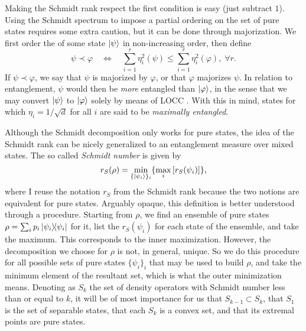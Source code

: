 		Making the Schmidt rank respect the first condition is easy (just subtract $1$). Using the Schmidt spectrum to impose a partial ordering on the set of pure states requires some extra caution, but it can be done through majorization. We first order the  of some state $\ket{\psi}$ in non-increasing order, then define
		$$
			\psi \prec \varphi \quad\Longleftrightarrow\quad \sum_{i=1}^{r} \eta_i^2(\psi) \leq \sum_{i=1}^{r} \eta_i^2(\varphi), \;\forall r .
		$$
		If $\psi \prec \varphi$, we say that $\psi$ is majorized by $\varphi$, or that $\varphi$ majorizes $\psi$. In relation to entanglement, $\psi$ would then be \emph{more} entangled than $\ket{\varphi}$, in the sense that we may convert $\ket{\psi}$ to $\ket{\varphi}$ solely by means of LOCC \cite{nielsen_1999_majorization,terra_tese}. With this in mind, states for which $\eta_i = 1/\sqrt{d}$ for all $i$ are said to be \emph{maximally entangled}.
	
		Although the Schmidt decomposition only works for pure states, the idea of the Schmidt rank can be nicely generalized to an entanglement measure over mixed states. The so called \emph{Schmidt number} \cite{terhal_2000_schmidtnumber} is given by 
		\begin{equation}
			r_S(\rho) = \min_{\{ \ket{\psi_i} \}_i} \{ \max_i \left[ r_S(\psi_i ) \right] \} ,
			\label{eq:schmidt-number}
		\end{equation}
		where I reuse the notation $r_S$ from the Schmidt rank because the two notions are equivalent for pure states. Arguably opaque, this definition is better understood through a procedure. Starting from $\rho$, we find an ensemble of pure states $\rho = \sum_i p_i \ketbra{\psi_i}{\psi_i}$ for it, list the $r_S(\psi_i)$ for each state of the ensemble, and take the maximum. This corresponds to the inner maximization. However, the decomposition we choose for $\rho$ is not, in general, unique. So we do this procedure for all possible sets of pure states $\{ \psi_i \}_i$ that may be used to build $\rho$, and take the minimum element of the resultant set, which is what the outer minimization means. Denoting as $S_k$ the set of density operators with Schmidt number less than or equal to $k$, it will be of most importance for us that $S_{k-1} \subset S_k$, that $S_1$ is the set of separable states, that each $S_k$ is a convex set, and that its extremal points are pure states.
	
